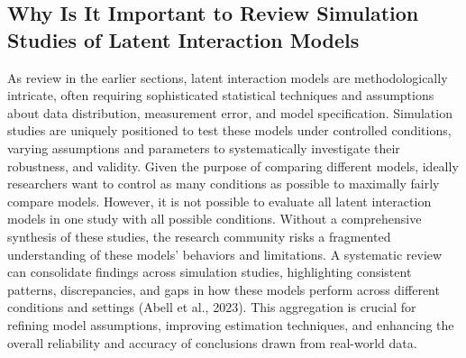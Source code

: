 \documentclass[
  man]{apa7}
\begin{document}
\hypertarget{why-is-it-important-to-review-simulation-studies-of-latent-interaction-models}{%
\subsection{Why Is It Important to Review Simulation Studies of Latent Interaction Models}\label{why-is-it-important-to-review-simulation-studies-of-latent-interaction-models}}

As review in the earlier sections, latent interaction models are methodologically intricate, often requiring sophisticated statistical techniques and assumptions about data distribution, measurement error, and model specification. Simulation studies are uniquely positioned to test these models under controlled conditions, varying assumptions and parameters to systematically investigate their robustness, and validity. Given the purpose of comparing different models, ideally researchers want to control as many conditions as possible to maximally fairly compare models. However, it is not possible to evaluate all latent interaction models in one study with all possible conditions. Without a comprehensive synthesis of these studies, the research community risks a fragmented understanding of these models' behaviors and limitations. A systematic review can consolidate findings across simulation studies, highlighting consistent patterns, discrepancies, and gaps in how these models perform across different conditions and settings (Abell et al., 2023). This aggregation is crucial for refining model assumptions, improving estimation techniques, and enhancing the overall reliability and accuracy of conclusions drawn from real-world data.
\end{document}
